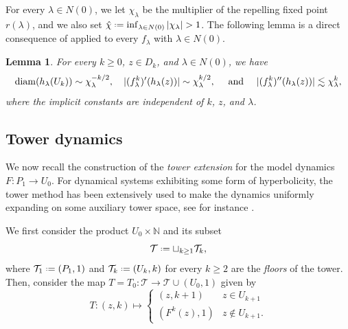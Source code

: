 \documentclass[11pt]{amsart}
\theoremstyle{plain}
\newtheorem{lem}[thm]{Lemma}
\theoremstyle{definition}
\theoremstyle{remark}
\newcommand*{\defeq}{\mathrel{\vcenter{\baselineskip0.5ex \lineskiplimit0pt
			\hbox{\scriptsize.}\hbox{\scriptsize.}}}%
	=}
\begin{document}
\medskip

For every $\lambda \in N(0)$, 
we let
$\chi_\lambda$ be the multiplier of the repelling fixed point $r(\lambda)$, and we also set $\hat \chi \defeq \inf_{\lambda \in N(0)} |\chi_\lambda|>1$.
The following lemma is a direct consequence of \cite[Lemma 1]{MakSmir03} applied to every $f_\lambda$ with $\lambda \in N(0)$.

\begin{lem}\label{l:L1MS}
For every $k \ge 0$, $z\in D_k$, and $\lambda \in N(0)$,
we have
\[
{\rm diam}
(h_\lambda( U_k)) \sim \chi_\lambda^{-k/2}, \quad
| (f^k_\lambda)' (h_\lambda (z))| 
\sim \chi_\lambda^{k/2},
\quad
\mbox{ and  }
\quad
|
(f^k_\lambda)'' (h_\lambda (z))|
\lesssim \chi_\lambda^k,\]
where the implicit constants
are independent of $k$, $z$,
and
$\lambda$.
\end{lem}


\subsection{Tower dynamics}\label{sec_3.2_tower}
We now recall the construction of the \emph{tower extension}
for the model dynamics $F \colon P_1 \to U_0$.
For dynamical systems exhibiting some form of hyperbolicity, the tower method has been extensively used to make the dynamics uniformly expanding on some auxiliary tower space, see for instance \cite{Hofbauer80, Young98}.

We first consider the product $U_0\times \mathbb N$ and its subset
\[
\mathcal T \defeq \sqcup_{k \geq 1} \mathcal T_k,
\]
where $\mathcal T_1 \defeq (P_1, 1)$
and 
$\mathcal T_k \defeq
(U_k, k)$
for every $k\geq 2$ are the \emph{floors} of the tower. Then, consider the map $T=T_0 \colon \mathcal T\to \mathcal T \cup (U_0,1)$
given by
\begin{equation}\label{eq:def-map-T}
T\colon (z,k)
\mapsto
\begin{cases}
(z,k+1) & z\in U_{k+1}\\
(F^k (z), 1) & z\notin U_{k+1}.
\end{cases}
\end{equation}
\end{document}
